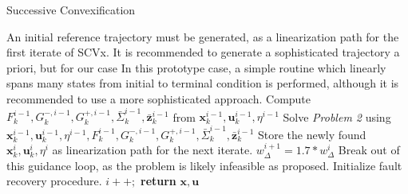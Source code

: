 \documentclass[conf]{new-aiaa}
\begin{document}
\begin{algorithm}
\caption{Successive Convexification}\label{Successive}
\begin{algorithmic}[1]
\State An initial reference trajectory must be generated, as a linearization path for the first iterate of SCVx. It is recommended to generate a sophisticated trajectory a priori, but for our case 
 In this prototype case, a simple routine which linearly spans many states from initial to terminal condition is performed, although it is recommended to use a more sophisticated approach.
\State Compute $F_k^{i-1}, G_k^{-,i-1}, G_k^{+,i-1}, \bar{\Sigma}_k^{i-1}, \bar{\mathbf{z}}_k^{i-1}$ from $\mathbf{x}_k^{i-1}, \mathbf{u}_k^{i-1}, \eta^{i-1}$
\State Solve \textit{Problem 2} using $\mathbf{x}_k^{i-1}, \mathbf{u}_k^{i-1}, \eta^{i-1}, F_k^{i-1}, G_k^{-,i-1}, G_k^{+,i-1}, \bar{\Sigma}_k^{i-1}, \bar{\mathbf{z}}_k^{i-1}$
\State Store the newly found $\mathbf{x}_k^{i}, \mathbf{u}_k^{i}, \eta^{i}$ as linearization path for the next iterate.
\State $w^{i+1}_\Delta = 1.7*w^{i}_\Delta$
\State Break out of this guidance loop, as the problem is likely infeasible as proposed.
\State Initialize fault recovery procedure.
\EndIf
\State $i++;$
\EndWhile 
\State \textbf{return} $\mathbf{x}, \mathbf{{}u}$
\EndProcedure
\end{algorithmic}
\end{algorithm}
\end{document}
